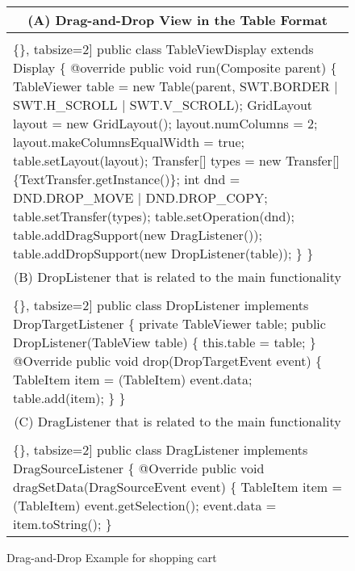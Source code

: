 \begin{figure}[!htb]
 \begin{minipage}{0.47\textwidth}
\scriptsize 
\begin{tabular}{@{}p{}} 
 \hline 
  \multicolumn{1}{c}{(A) Drag-and-Drop View in the Table Format } \\ \hline
  \vspace{-4mm}
\begin{Verbatim}[commandchars=\\\{\}, tabsize=2]
public class TableViewDisplay extends Display \{
@override
  public void run(Composite parent) \{
    TableViewer table = new Table(parent, SWT.BORDER | 
      SWT.H_SCROLL | SWT.V_SCROLL);
    GridLayout layout = new GridLayout();
    layout.numColumns = 2;
    layout.makeColumnsEqualWidth = true;
    table.setLayout(layout);
    Transfer[] types = new Transfer[] \{TextTransfer.getInstance()\};
    int dnd = DND.DROP_MOVE | DND.DROP_COPY;
    table.setTransfer(types);
    table.setOperation(dnd);
    table.addDragSupport(new DragListener());
    table.addDropSupport(new DropListener(table));
  \} \}
\end{Verbatim}
\vspace{-4mm}
 \\ \hline
  \multicolumn{1}{c}{(B) DropListener that is related to the main functionality} \\ \hline
    \vspace{-4mm}
\begin{Verbatim}[commandchars=\\\{\}, tabsize=2]
public class DropListener implements DropTargetListener \{
    private TableViewer table;
    public DropListener(TableView table) 
       \{ this.table = table; \}
 @Override
    public void drop(DropTargetEvent event) \{
      TableItem item = (TableItem) event.data;
       table.add(item);
   \} \}
 \end{Verbatim}
   \vspace{-4mm}
  \\ \hline
   \multicolumn{1}{c}{(C) DragListener  that is related to the main functionality} \\ \hline
  \vspace{-4mm}
\begin{Verbatim}[commandchars=\\\{\}, tabsize=2]
public class DragListener implements DragSourceListener \{
   @Override
  public void dragSetData(DragSourceEvent event) \{
    TableItem item = (TableItem) event.getSelection();
    event.data = item.toString();
  \}
\end{Verbatim}
\vspace{-4mm}
 \\ \hline
\end{tabular} 
\caption{Drag-and-Drop Example for shopping cart}
\label{fig:cartTable}
\end{minipage}
\end{figure}


